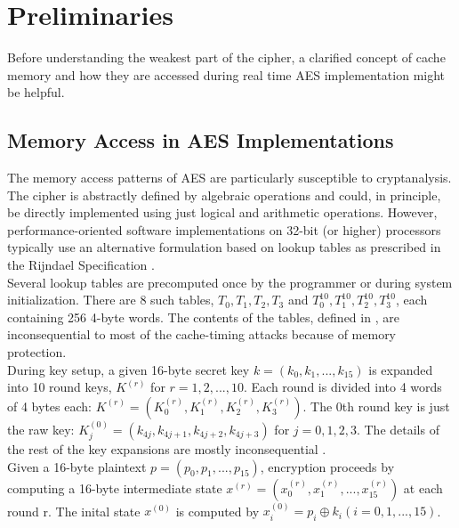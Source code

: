 \section{Preliminaries}

Before understanding the weakest part of the cipher, a clarified concept of cache memory and how they are accessed during real time AES implementation might be helpful.\\

\subsection{Memory Access in AES Implementations}

The memory access patterns of AES are particularly susceptible to cryptanalysis. The cipher is abstractly defined by algebraic operations and could, in principle, be directly implemented using just logical and arithmetic operations. However, performance-oriented software implementations on 32-bit (or higher) processors typically use an alternative formulation based on lookup tables as prescribed in the Rijndael Specification \citep{daemen2002design}.\\

Several lookup tables are precomputed once by the programmer or during system initialization. There are 8 such tables, $T_0,T_1,T_2,T_3$ and $T_0^{10},T_1^{10},T_2^{10},T_3^{10}$, each containing 256 4-byte words. The contents of the tables, defined in \citep{daemen2002design}, are inconsequential to most of the cache-timing attacks because of memory protection.\\

During key setup, a given 16-byte secret key $k=(k_0,k_1,...,k_{15})$ is expanded into 10 round keys, $K^{(r)}$ for $r=1,2,...,10$. Each round is divided into 4 words of 4 bytes each: $K^{(r)}=(K_0^{(r)},K_1^{(r)},K_2^{(r)},K_3^{(r)})$. The 0th round key is just the raw key: $K_j^{(0)}=(k_{4j},k_{4j+1},k_{4j+2},k_{4j+3})$ for $j=0,1,2,3$. The details of the rest of the key expansions are mostly inconsequential \citep{osvik}.\\

Given a 16-byte plaintext $p=(p_0,p_1,...,p_{15})$, encryption proceeds by computing a 16-byte intermediate state $x^{(r)}=(x_0^{(r)},x_1^{(r)},...,x_{15}^{(r)})$ at each round r. The inital state $x^{(0)}$ is computed by $x_i^{(0)}=p_i \oplus k_i ( i=0,1,...,15 )$.

